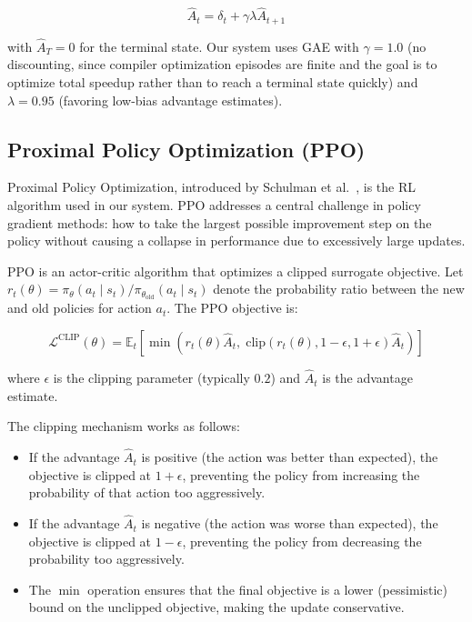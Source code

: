 \begin{equation}
    \hat{A}_t = \delta_t + \gamma \lambda \hat{A}_{t+1}
\end{equation}

with $\hat{A}_T = 0$ for the terminal state. Our system uses GAE with $\gamma = 1.0$ (no discounting, since compiler optimization episodes are finite and the goal is to optimize total speedup rather than to reach a terminal state quickly) and $\lambda = 0.95$ (favoring low-bias advantage estimates).

\subsection{Proximal Policy Optimization (PPO)}

Proximal Policy Optimization, introduced by Schulman et al.~\cite{schulman2017ppo}, is the RL algorithm used in our system. PPO addresses a central challenge in policy gradient methods: how to take the largest possible improvement step on the policy without causing a collapse in performance due to excessively large updates.

PPO is an actor-critic algorithm that optimizes a clipped surrogate objective. Let $r_t(\theta) = \pi_\theta(a_t \mid s_t) / \pi_{\theta_{\text{old}}}(a_t \mid s_t)$ denote the probability ratio between the new and old policies for action $a_t$. The PPO objective is:

\begin{equation}
    \mathcal{L}^{\text{CLIP}}(\theta) = \mathbb{E}_t \left[ \min\left( r_t(\theta) \hat{A}_t, \; \text{clip}(r_t(\theta), 1 - \epsilon, 1 + \epsilon) \hat{A}_t \right) \right]
\end{equation}

where $\epsilon$ is the clipping parameter (typically $0.2$) and $\hat{A}_t$ is the advantage estimate.

The clipping mechanism works as follows:
\begin{itemize}
    \item If the advantage $\hat{A}_t$ is positive (the action was better than expected), the objective is clipped at $1 + \epsilon$, preventing the policy from increasing the probability of that action too aggressively.
    \item If the advantage $\hat{A}_t$ is negative (the action was worse than expected), the objective is clipped at $1 - \epsilon$, preventing the policy from decreasing the probability too aggressively.
    \item The $\min$ operation ensures that the final objective is a lower (pessimistic) bound on the unclipped objective, making the update conservative.
\end{itemize}

